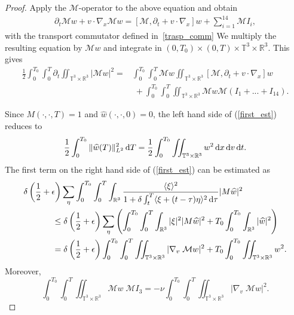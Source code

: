 \documentclass[11pt,american, reqno]{amsart}
\numberwithin{equation}{section}
\newcommand{\R}{\mathbb R}
\newcommand{\1}{\mathds{1}}
\newcommand{\del}{\partial}
\newcommand{\dt}{\, {\rm d} t}
\newcommand{\dT}{\, {\rm d} T}
\newcommand{\dv}{\, {\rm d} v}
\newcommand{\dx}{\, {\rm d} x}
\newcommand{\CalM}{\mathcal{M}}
\newcommand{\CalF}{\mathcal{F}}
\newcommand{\dtau}{\, {\rm d} \tau}
\newcommand{\vpran}[1]{\left(#1\right)}
\newcommand{\Eps}{\epsilon}
\newcommand{\T}{\mathbb{T}}
\numberwithin{equation}{section}
\begin{document}
\begin{proof}
Apply the $\CalM$-operator to the above equation and obtain 
\begin{align*}
  \del_t \CalM w  + v \cdot \nabla_x \CalM w
= [\CalM, \partial_t + v \cdot \nabla_x]w + \sum_{i=1}^{14} \CalM  I_i   ,
\end{align*}
with the transport commutator defined in~\eqref{trasp_comm}
We multiply the resulting equation by ${{\CalM} w}$ and integrate in $(0, T_0) \times (0,T) \times \T^3 \times \R^3$. This gives
\begin{align} \label{first_est}
\frac{1}{2}\int_0^{T_0} \int_0^{T}   \partial _t \iint_{\T^3 \times \R^3} |{\CalM} w|^2 
= & \int_0^{T_0}  \int_0^{T}  {\CalM} w  \iint_{\T^3 \times \R^3} [\CalM, \partial_t + v \cdot \nabla_x]w %
\nonumber 
\\
&\;+ \int_0^{T_0}  \int_0^{T}  \iint_{\T^3 \times \R^3}  {{\CalM}w} {\CalM} ( {I_1} + ...+  {I_{14}}). %
\end{align}


Since ${M}(\cdot,\cdot,T)=1$ and $\widehat w(\cdot,\cdot,0)=0$, the left hand side of (\ref{first_est}) reduces to 
$$
\frac{1}{2} \int_0^{T_0} \|\widehat w(T) \|_{L^2}^2 \dT = \frac{1}{2} \int_0^{T_0} \iint_{\T^3 \times \R^3}  w^2 \dx\dv\dt .
$$
The first term on the right hand side of (\ref{first_est}) can be estimated as 
\begin{align*}
 \delta \left(\frac{1}{2}+ \Eps\right)& \sum_{\eta}\int_0^{T_0} \int_0^T \int_{\R^3} \frac{ \langle \xi \rangle^{2}}{{ 1 + \delta \int_t ^T \langle \xi +(t- \tau) \eta\rangle^{2} \dtau}} |{M}\widehat w|^2 %
\\
 \le  & \;\delta  \left(\frac{1}{2}+ \Eps\right)\sum_{\eta} \left( \int_0^{T_0} \int_0^T \int_{\R^3}   
 | \xi |^{2}  |{M}\widehat w|^2 %
 + T_0 \int_0^{T_0} \int_{\R^3}  |\widehat w|^2 
 \right)
\\
 = & \;\delta  \left(\frac{1}{2}+ \Eps\right) \int_0^{T_0} \int_0^T \iint_{\T^3 \times \R^3} |\nabla_v \;\CalM w|^2 %
 + T_0 \int_0^{T_0} \iint_{\T^3 \times \R^3}   w^2. %
\end{align*}
Moreover, 
$$
 \int_0^{T_0} \int_0^T   \iint_{\T^3 \times \R^3} \CalM w  \; {\CalM} { I_3} 
 = - \nu  \int_0^{T_0} \int_0^T  \iint_{\T^3 \times \R^3}   |\nabla_v \; \mathcal{M} w| ^2. %
$$



\end{proof}
\end{document}
